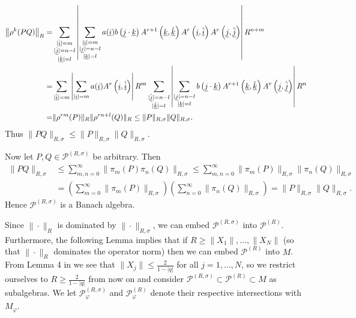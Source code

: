 	\begin{align*}
		\left\|\rho^k(PQ)\right\|_{R} =&\sum_{\substack{|\underline{\hat{i}}|=m\\ |\underline{\hat{j}}|=n-l \\ |\underline{\hat{k}}|=l}} \left|\sum_{\substack{|\underline{i}|=m\\ |\underline{j}|=n-l\\  |\underline{k}|=l}} a(\underline{i})b\left(\underline{j}\cdot\underline{k}\right) A^{r+1}\left( \underline{k}, \underline{\hat{k}}\right)  A^r\left(\underline{i},\underline{\hat{i}}\right)A^r\left(\underline{j},\underline{\hat{j}}\right)\right| R^{n+m}\\
					=&\sum_{|\underline{\hat{i}}|=m} \left|\sum_{|\underline{i}|=m}a(\underline{i}) A^r\left(\underline{i},\underline{\hat{i}}\right)\right| R^m \sum_{\substack{|\underline{\hat{j}}|=n-l\\ |\underline{\hat{k}}|=l}} \left| \sum_{\substack{|\underline{j}|=n-l\\ |\underline{k}|=l}}b\left(\underline{j}\cdot\underline{k}\right) A^{r+1}\left( \underline{k},\underline{\hat{k}}\right) A^r\left( \underline{j}, \underline{\hat{j}}\right) \right|R^n\\
					=&\|\rho^{rm}(P)\|_R\|\rho^{rn+l}(Q)\|_R\leq \|P\|_{R,\sigma}\|Q\|_{R,\sigma}.
	\end{align*}
Thus $\|PQ\|_{R,\sigma}\leq \|P\|_{R,\sigma}\|Q\|_{R,\sigma}$.\par
Now let $P,Q\in\mathscr{P}^{(R,\sigma)}$ be arbitrary. Then
	\begin{align*}
		\|PQ\|_{R,\sigma}&\leq \sum_{m,n=0}^\infty \| \pi_m(P)\pi_n(Q)\|_{R,\sigma} \leq \sum_{m,n=0}^\infty \|\pi_m(P)\|_{R,\sigma}\|\pi_n(Q)\|_{R,\sigma}\\
					& = \left(\sum_{m=0}^\infty \|\pi_m(P)\|_{R,\sigma}\right)\left(\sum_{n=0}^\infty \|\pi_n(Q)\|_{R,\sigma}\right)=\|P\|_{R,\sigma}\|Q\|_{R,\sigma}.
	\end{align*}
Hence $\mathscr{P}^{(R,\sigma)}$ is a Banach algebra.

Since $\|\cdot \|_R$ is dominated by $\|\cdot \|_{R,\sigma}$, we can embed $\mathscr{P}^{(R,\sigma)}$ into $\mathscr{P}^{(R)}$. Furthermore, the following Lemma implies that if $R\geq\|X_1\|,\ldots, \|X_N\|$ (so that $\|\cdot\|_R$ dominates the operator norm) then we can embed $\mathscr{P}^{(R)}$ into $M$. From Lemma 4 in \cite{BS91} we see that $\|X_j\| \leq \frac{2}{1-|q|}$ for all $j=1,\ldots, N$, so we restrict ourselves to $R\geq \frac{2}{1-|q|}$ from now on and consider $\mathscr{P}^{(R,\sigma)}\subset \mathscr{P}^{(R)}\subset M$ as subalgebras. We let $\mathscr{P}_\varphi^{(R,\sigma)}$ and $\mathscr{P}_\varphi^{(R)}$ denote their respective intersections with $M_\varphi$.


